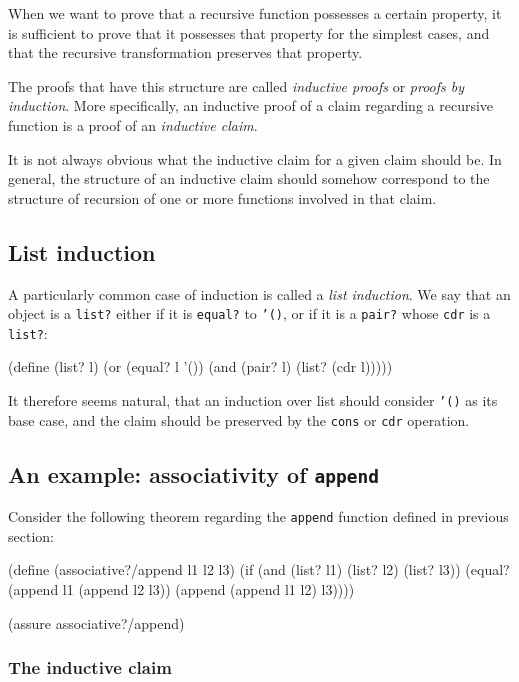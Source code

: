 When we want to prove that a recursive function possesses a certain
property, it is sufficient to prove that it possesses that property
for the simplest cases, and that the recursive transformation preserves
that property.

The proofs that have this structure are called \textit{inductive proofs}
or \textit{proofs by induction}. More specifically, an inductive proof
of a claim regarding a recursive function is a proof of an
\textit{inductive claim}.

It is not always obvious what the inductive claim for a given claim
should be. In general, the structure of an inductive claim should
somehow correspond to the structure of recursion of one or more
functions involved in that claim.

\subsection{List induction}

A particularly common case of induction is called a \textit{list induction}.
We say that an object is a \texttt{list?} either if it is \texttt{equal?}
to \texttt{'()}, or if it is a \texttt{pair?} whose \texttt{cdr} is
a \texttt{list?}:

\begin{Snippet}
  (define (list? l)
    (or (equal? l '())
        (and (pair? l)
             (list? (cdr l)))))
\end{Snippet}

It therefore seems natural, that an induction over list should
consider \texttt{'()} as its base case, and the claim should be
preserved by the \texttt{cons} or \texttt{cdr} operation.

\subsection{An example: associativity of \texttt{append}}

Consider the following theorem regarding the \texttt{append} function
defined in previous section:

\begin{Snippet}
  (define (associative?/append l1 l2 l3)
    (if (and (list? l1) (list? l2) (list? l3))
        (equal? (append l1 (append l2 l3))
                (append (append l1 l2) l3))))

  (assure associative?/append)
\end{Snippet}

\subsubsection{The inductive claim}

